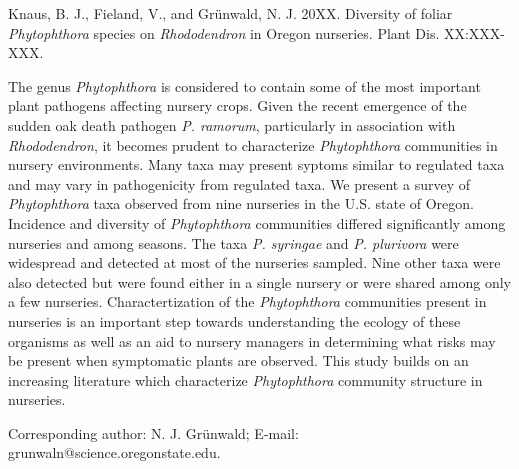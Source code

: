 \documentclass[12pt]{article}
\begin{document}
\begin{flushleft}
Knaus, B. J., Fieland, V., and Gr\"{u}nwald, N. J. 20XX. Diversity of foliar \textit{Phytophthora} species on \textit{Rhododendron} in Oregon nurseries. Plant Dis. XX:XXX-XXX.
\\

\hspace{12pt}


\linenumbers


The genus \emph{Phytophthora} is considered to contain some of the most important plant pathogens affecting nursery crops. Given the recent emergence of the sudden oak death pathogen \emph{P. ramorum}, particularly in association with \emph{Rhododendron}, it becomes prudent to characterize \emph{Phytophthora} communities in nursery environments.  Many taxa may present syptoms similar to regulated taxa and may vary in pathogenicity from regulated taxa.  We present a survey of \emph{Phytophthora} taxa observed from nine nurseries in the U.S. state of Oregon.  Incidence and diversity of \emph{Phytophthora} communities differed significantly among nurseries and among seasons.  The taxa \emph{P. syringae} and \emph{P. plurivora} were widespread and detected at most of the nurseries sampled.  Nine other taxa were also detected but were found either in a single nursery or were shared among only a few nurseries.  Charactertization of the \emph{Phytophthora} communities present in nurseries is an important step towards understanding the ecology of these organisms as well as an aid to nursery managers in determining what risks may be present when symptomatic plants are observed.  This study builds on an increasing literature which characterize \emph{Phytophthora} community structure in nurseries.


\hspace{12pt}

Corresponding author: N. J. Gr\"{u}nwald; E-mail: grunwaln@science.oregonstate.edu.

\end{flushleft}

\end{document}
